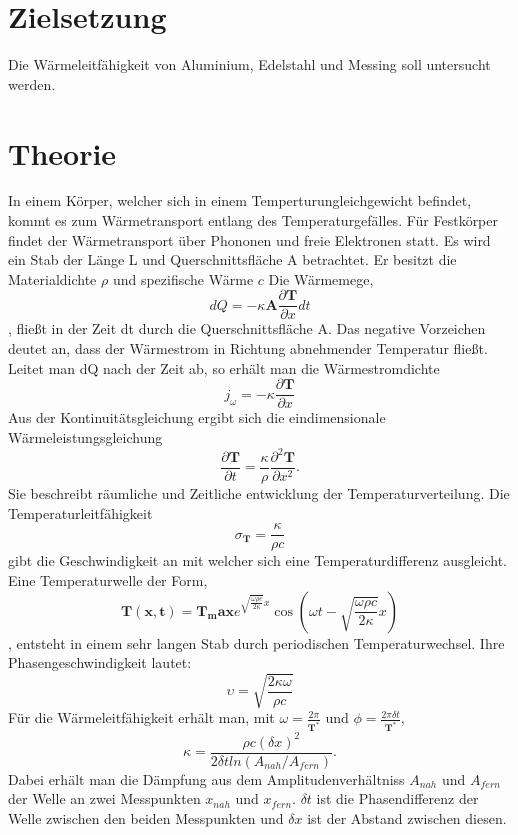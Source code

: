 \section{Zielsetzung}
Die Wärmeleitfähigkeit von Aluminium, Edelstahl und Messing soll untersucht werden.
\section{Theorie}
\label{sec:Theorie}
In einem Körper, welcher sich in einem Temperturungleichgewicht befindet, kommt es zum Wärmetransport entlang des Temperaturgefälles.
Für Festkörper findet der Wärmetransport über Phononen und freie Elektronen statt.
Es wird ein Stab der Länge L und Querschnittsfläche A betrachtet.
Er besitzt die Materialdichte $\rho$ und spezifische Wärme $c$
Die Wärmemege,
\begin{equation}
  dQ =-  \kappa \symbf{A} \frac{\partial\symbf{T}}{\partial x} dt
\end{equation}
, fließt in der Zeit dt durch die Querschnittsfläche A.
Das negative Vorzeichen deutet an, dass der Wärmestrom in Richtung abnehmender Temperatur fließt.
Leitet man dQ nach der Zeit ab, so erhält man die Wärmestromdichte
\begin{equation}
 j_\omega =- \kappa \frac{\partial \symbf{T}}{\partial x}
\end{equation}
Aus der Kontinuitätsgleichung ergibt sich die eindimensionale Wärmeleistungsgleichung
\begin{equation}
  \frac{\partial \symbf{T}}{\partial t} = \frac {\kappa}{\rho} \frac{\partial^2  \symbf{T}}{\partial x^2}  .
\end{equation}
Sie beschreibt räumliche und Zeitliche entwicklung der Temperaturverteilung.
Die Temperaturleitfähigkeit
\begin{equation}
  \sigma_\symbf{T} = \frac{\kappa}{\rho c}
\end{equation}
gibt die Geschwindigkeit an mit welcher sich eine Temperaturdifferenz ausgleicht.
\\
Eine Temperaturwelle der Form,
\begin{equation}
  \symbf{T(x,t)} = \symbf{T_max}e^{\sqrt{\frac{\omega\rho c}{2 \kappa}}x} \cos(\omega t - \sqrt{\frac{\omega\rho c}{2 \kappa}}x)
\end{equation}
, entsteht in einem sehr langen Stab durch periodischen Temperaturwechsel.
Ihre Phasengeschwindigkeit lautet:
\begin{equation}
  \upsilon = \sqrt{\frac{2\kappa\omega}{\rho c}}
\end{equation}
Für die Wärmeleitfähigkeit erhält man, mit  $\omega=\frac{2\pi}{\symbf{T^*}}$ und $\phi=\frac{2\pi\delta t}{\symbf{T^*}}$,
\begin{equation}
  \kappa = \frac{\rho c(\delta x)^2}{2\delta t ln(A_{nah}/A_{fern})}  .
\end{equation}
Dabei erhält man die Dämpfung aus dem Amplitudenverhältniss $A_{nah}$ und $A_{fern}$ der Welle an zwei Messpunkten $x_{nah}$ und $x_{fern}$.
$\delta t$ ist die Phasendifferenz der Welle zwischen den beiden Messpunkten und $\delta x$ ist der Abstand zwischen diesen.
\cite{sample}
